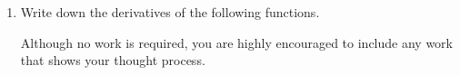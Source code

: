 \documentclass[11pt]{article}
\begin{document}
\begin{enumerate}
\begin{enumerate}
    \[\log_3(2x^2+3)=2\]
             \vspace{0.5cm}
        
{\color{blue}Solution: 
\begin{align*}
\log_3(2x^2+3) &=2 \iff \\
3^{\log_3(2x^2+3)}&=3^{2} \iff\\
2x^2 + 3 &= 9 \iff\\
2x^2  &= 6 \iff\\
x^2 &= 3 \iff\\
x & = \pm \sqrt{3}
\end{align*}
Check: $x = \sqrt{3} \\
\log_3(2(\sqrt{3})^2+3) = \log_3(2\cdot 3+3) = \log_3(6+3) = \log_3(9) = 2  \ \checkmark$
\medskip

Check: $x = -\sqrt{3}\\
\log_3(2(-\sqrt{3})^2+3) = \log_3(2\cdot 3+3) = \log_3(6+3) = \log_3(9) = 2  \ \checkmark$
}
    \vfill
\end{enumerate}




\newpage


\item Write down the derivatives of the following functions. 

Although no work is required, you are highly encouraged to include any work that shows your thought process. 


\end{enumerate}
\end{document}

